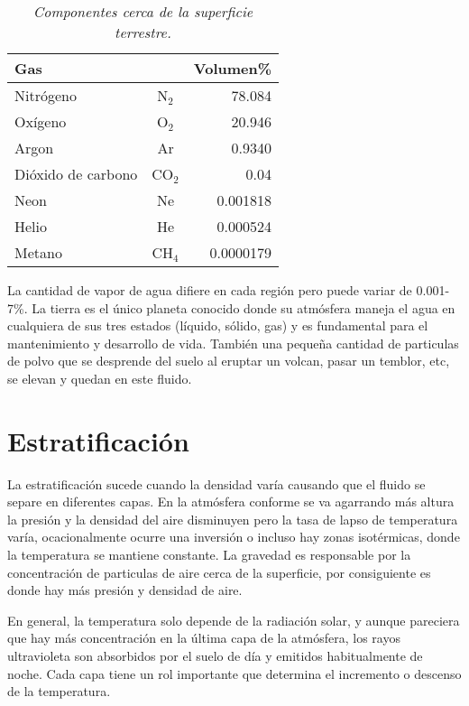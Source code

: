 \documentclass[12pt]{article}
\begin{document}
\tiny{
\begin{table}[!hbt]
\begin{center}
\begin{tabular}{l c r}
\toprule
Gas& &Volumen\% \\
\midrule
Nitr\'ogeno & N$_2$ & 78.084\\
\addlinespace
Ox\'igeno & O$_2$ & 20.946\\
\addlinespace
Argon & Ar & 0.9340\\
\addlinespace
Di\'oxido de carbono & CO$_2$ &0.04\\
\addlinespace
Neon & Ne & 0.001818\\
\addlinespace
Helio & He & 0.000524\\
\addlinespace
Metano & CH$_4$ & 0.0000179\\
\bottomrule
\end{tabular}
\caption{\scriptsize{\emph{Componentes cerca de la superficie terrestre.}}}
\end{center}
\end{table}
}
\normalsize
La cantidad de vapor de agua difiere en cada regi\'on pero puede variar de 0.001-7\%. La tierra es el \'unico planeta conocido donde su atm\'osfera maneja el agua en cualquiera de sus tres estados (l\'iquido, s\'olido, gas) y es fundamental para el mantenimiento y desarrollo de vida. Tambi\'en una pequeña cantidad de particulas de polvo que se desprende del suelo al eruptar un volcan, pasar un temblor, etc, se elevan y quedan en este fluido. 

\section{Estratificaci\'on}
\noindent 
La estratificaci\'on sucede cuando la densidad var\'ia causando que el fluido se separe en diferentes capas. En la atm\'osfera conforme se va agarrando m\'as altura la presi\'on y la densidad del aire disminuyen pero la tasa de lapso de temperatura var\'ia, ocacionalmente ocurre una inversi\'on o incluso hay zonas isot\'ermicas, donde la temperatura se mantiene constante. La gravedad es responsable por la concentraci\'on de particulas de aire cerca de la superficie, por consiguiente es donde hay m\'as presi\'on y densidad de aire. 

En general, la temperatura solo depende de la radiaci\'on solar, y aunque pareciera que hay m\'as concentraci\'on en la \'ultima capa de la atm\'osfera, los rayos ultravioleta son absorbidos por el suelo de d\'ia y emitidos habitualmente de noche. Cada capa tiene un rol importante que determina el incremento o descenso de la temperatura. 
\end{document}
